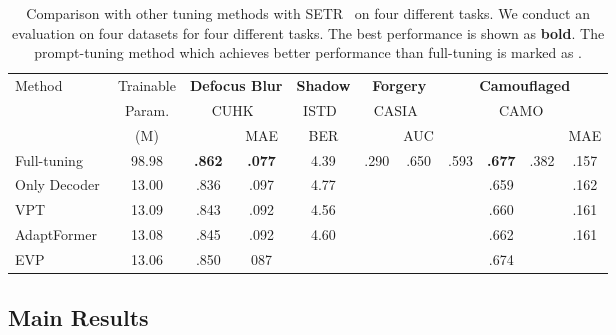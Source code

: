 \begin{table*}[t]
\centering
{
\begin{tabular}{l||c|cc|c|cc|cccc}
\toprule
\multirow{3}{*}{Method} & Trainable & \multicolumn{2}{c|}{\textbf{Defocus Blur}} & \textbf{Shadow} & \multicolumn{2}{c|}{\textbf{Forgery }} & \multicolumn{4}{c}{\textbf{Camouflaged}}\\
      & Param.&  \multicolumn{2}{c|}{CUHK~\cite{shi2014discriminative}} & ISTD~\cite{wang2018stacked}& \multicolumn{2}{c|}{CASIA~\cite{dong2013casia}} & \multicolumn{4}{c}{CAMO~\cite{le2019anabranch}}\\ 
      & (M) & & MAE       & BER     &  & AUC   &  &    &   & MAE    \\ \hline
Full-tuning & 98.98 & \bf.862 & \bf.077 & 4.39  & .290 & .650  & .593 & \bf.677 & .382 & .157 \\ 
Only Decoder & 13.00 & .836 & .097 & 4.77  & \color{orange}{.318} & \color{orange}{.662}  & \color{orange}{.615} & .659 & \color{orange}{.385} & .162 \\ 
VPT~\cite{vpt}  & 13.09 & .843  & .092  & 4.56 & \color{orange}{.315} & \color{orange}{.666} & \color{orange}{.615} & .660 & \color{orange}{.387} & .161 \\
AdaptFormer~\cite{chen2022adaptformer} & 13.08 & .845   & .092  & 4.60 & \color{orange}{.319} & \color{orange}{.662} & \color{orange}{.614} & .662 & \color{orange}{.387} & .161 \\
EVP & 13.06 & .850  & 087   & \color{orange}{\bf4.36} & \color{orange}{\bf.324}   & \color{orange}{\bf.675} & \color{orange}{\bf.622} & .674 & \color{orange}{\bf.402} & \color{orange}{\bf.156} \\ \bottomrule
\end{tabular}}
\caption{Comparison with other tuning methods with SETR~\cite{zheng2021rethinking} on four different tasks. We conduct an evaluation on four datasets for four different tasks.
The best performance is shown as \textbf{bold}. 
The prompt-tuning method which achieves better performance than full-tuning is marked as \color{orange}{orange}.}
\label{tab:setr}
\end{table*}
 
\subsection{Main Results}
\label{sec:main_results}


